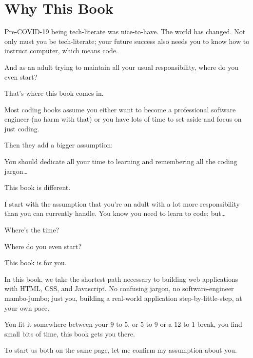 \section{Why This Book}\label{sec:why-this-book}

Pre-COVID-19 being tech-literate was nice-to-have.
The world has changed.
Not only must you be tech-literate;
your future success also needs you to know how to instruct computer, which means code.

And as an adult trying to maintain all your usual responsibility, where do you even start?

That's where this book comes in.

Most coding books assume you either want to become a professional software engineer
(no harm with that) or you have lots of time to set aside and focus on just coding.

Then they add a bigger assumption:

You should dedicate all your time to learning and remembering all the coding jargon…

This book is different.

I start with the assumption that you're an adult with a lot more responsibility than you can currently handle.
You know you need to learn to code; but\ldots

Where's the time?

Where do you even start?

This book is for you.

In this book, we take the shortest path necessary to building web applications with HTML, CSS, and Javascript.
No confusing
jargon, no software-engineer mambo-jumbo; just you, building a real-world application step-by-little-step, at your own
pace.

You fit it somewhere between your 9 to 5, or 5 to 9 or a 12 to 1 break, you find small bits of time, this book gets you there.

To start us both on the same page, let me confirm my assumption about you.
